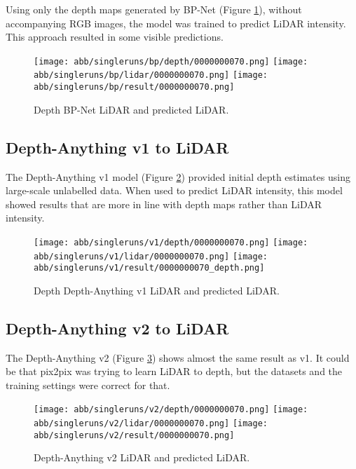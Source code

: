 Using only the depth maps generated by BP-Net (Figure \ref{bp_results}), without accompanying RGB images, the model was trained to predict LiDAR intensity. This approach resulted in some visible predictions.
\begin{figure}[!ht]
	\centering
	\texttt{[image: abb/singleruns/bp/depth/0000000070.png]}
	\texttt{[image: abb/singleruns/bp/lidar/0000000070.png]}
	\texttt{[image: abb/singleruns/bp/result/0000000070.png]}
	\caption{Depth BP-Net LiDAR and predicted LiDAR.}
	\label{bp_results}
\end{figure}
\newpage
\subsection{Depth-Anything v1 to LiDAR}

The Depth-Anything v1 model (Figure \ref{v1_results}) provided initial depth estimates using large-scale unlabelled data. When used to predict LiDAR intensity, this model showed results that are more in line with depth maps rather than LiDAR intensity.
\begin{figure}[!ht]
	\centering
	\texttt{[image: abb/singleruns/v1/depth/0000000070.png]}
	\texttt{[image: abb/singleruns/v1/lidar/0000000070.png]}
	\texttt{[image: abb/singleruns/v1/result/0000000070\_depth.png]}
	\caption{Depth Depth-Anything v1 LiDAR and predicted LiDAR.}
	\label{v1_results}
\end{figure}
\newpage
\subsection{Depth-Anything v2 to LiDAR}

The Depth-Anything v2 (Figure \ref{v2_results}) shows almost the same result as v1. It could be that pix2pix was trying to learn LiDAR to depth, but the datasets and the training settings were correct for that.
\begin{figure}[!ht]
	\centering
	\texttt{[image: abb/singleruns/v2/depth/0000000070.png]}
	\texttt{[image: abb/singleruns/v2/lidar/0000000070.png]}
	\texttt{[image: abb/singleruns/v2/result/0000000070.png]}
	\caption{Depth-Anything v2 LiDAR and predicted LiDAR.}
	\label{v2_results}
\end{figure}
\newpage
